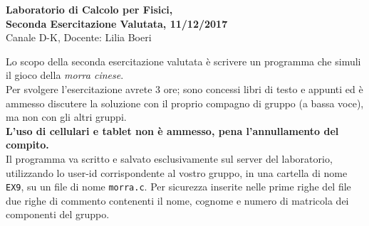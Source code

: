 \documentclass[11pt]{article}
\begin{document}
\pagestyle{empty}

\begin{center}
{\Large \bf  Laboratorio di Calcolo per Fisici,\\ Seconda Esercitazione Valutata, 11/12/2017 \\[2mm]}
{\large Canale D-K, Docente: Lilia Boeri}
\end{center}
\vspace{4mm}

\begin{mdframed}[backgroundcolor=gray!10]
Lo scopo della seconda esercitazione valutata \`e scrivere un programma che simuli il gioco della {\em morra cinese}. \\
Per svolgere l'esercitazione avrete 3 ore; sono concessi libri di testo e appunti
ed \`e ammesso discutere la soluzione con il proprio compagno di gruppo
(a bassa voce), ma non con gli altri gruppi.
\\
{\bf L'uso di cellulari e tablet non \`e ammesso, pena l'annullamento del compito.}
\\
Il programma va scritto e salvato esclusivamente sul server del laboratorio,
utilizzando lo user-id corrispondente al vostro gruppo, in una cartella
di nome \texttt{EX9}, su un file di nome \texttt{morra.c}. Per sicurezza inserite 
nelle prime righe del file due righe di commento contenenti il nome, cognome
e numero di matricola dei componenti del gruppo.
  \end{mdframed}
%
%
\end{document}
